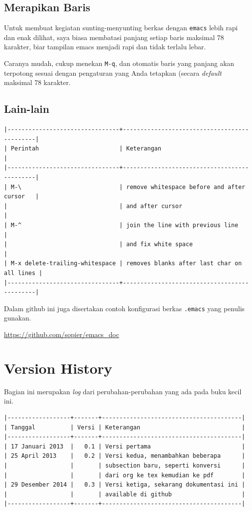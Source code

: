 \documentclass{article}
\begin{document}
\subsection{Merapikan Baris}
Untuk membuat kegiatan sunting-menyunting berkas dengan \verb=emacs=
lebih rapi dan enak dilihat, saya biasa membatasi panjang setiap baris
maksimal 78 karakter, biar tampilan emacs menjadi rapi dan tidak terlalu
lebar.

Caranya mudah, cukup menekan \verb=M-q=, dan otomatis baris yang panjang
akan terpotong sesuai dengan pengaturan yang Anda tetapkan (secara 
\emph{default} maksimal 78 karakter.


\subsection{Lain-lain}

\begin{verbatim}
|--------------------------------+---------------------------------------------|
| Perintah                       | Keterangan                                  |
|--------------------------------+---------------------------------------------|
| M-\                            | remove whitespace before and after cursor   |
|                                | and after cursor                            |
| M-^                            | join the line with previous line            |
|                                | and fix white space                         |
| M-x delete-trailing-whitespace | removes blanks after last char on all lines |
|--------------------------------+---------------------------------------------|
\end{verbatim}

Dalam github ini juga disertakan contoh konfigurasi berkas
\texttt{.emacs} yang penulis gunakan.

\url{https://github.com/sopier/emacs\_doc}

\section{Version History}
Bagian ini merupakan \emph{log} dari perubahan-perubahan yang ada pada buku
kecil ini.

\begin{verbatim}
|------------------+-------+----------------------------------------|
| Tanggal          | Versi | Keterangan                             |
|------------------+-------+----------------------------------------|
| 17 Januari 2013  |   0.1 | Versi pertama                          |
| 25 April 2013    |   0.2 | Versi kedua, menambahkan beberapa      |
|                  |       | subsection baru, seperti konversi      |
|                  |       | dari org ke tex kemudian ke pdf        |
| 29 Desember 2014 |   0.3 | Versi ketiga, sekarang dokumentasi ini |
|                  |       | available di github                    |
|------------------+-------+----------------------------------------|
\end{verbatim}
\end{document}
